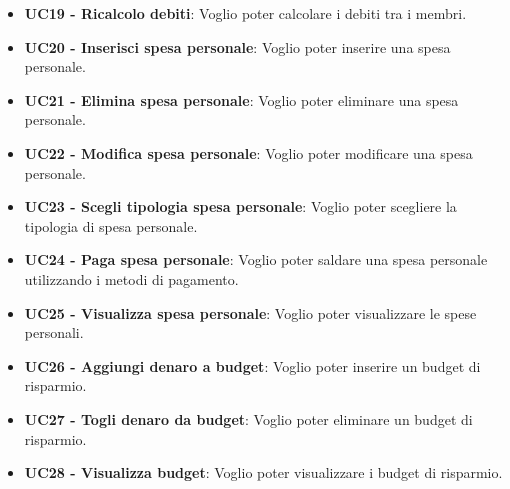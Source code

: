 \begin{itemize}
    \item \textbf{UC19 - Ricalcolo debiti}: Voglio poter calcolare i debiti tra i membri.
    \item \textbf{UC20 - Inserisci spesa personale}: Voglio poter inserire una spesa personale.
    \item \textbf{UC21 - Elimina spesa personale}: Voglio poter eliminare una spesa personale.
    \item \textbf{UC22 - Modifica spesa personale}: Voglio poter modificare una spesa personale.
    \item \textbf{UC23 - Scegli tipologia spesa personale}: Voglio poter scegliere la tipologia di spesa personale.
    \item \textbf{UC24 - Paga spesa personale}: Voglio poter saldare una spesa personale utilizzando i metodi di pagamento.
    \item \textbf{UC25 - Visualizza spesa personale}: Voglio poter visualizzare le spese personali.
    \item \textbf{UC26 - Aggiungi denaro a budget}: Voglio poter inserire un budget di risparmio.
    \item \textbf{UC27 - Togli denaro da budget}: Voglio poter eliminare un budget di risparmio.
    \item \textbf{UC28 - Visualizza budget}: Voglio poter visualizzare i budget di risparmio.
\end{itemize}
